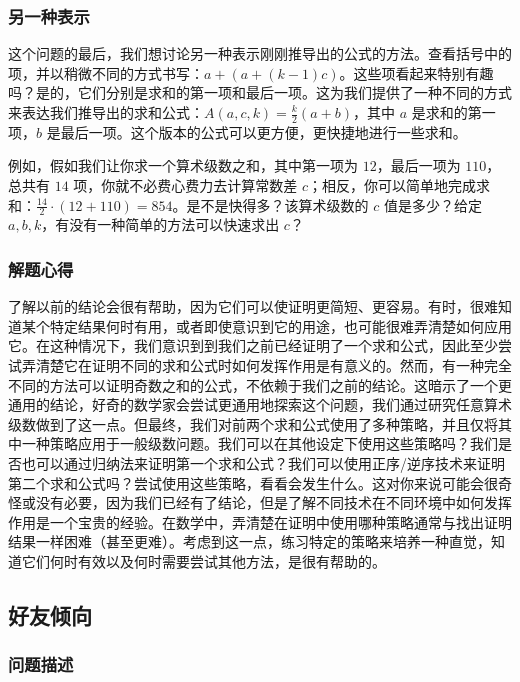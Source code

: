 \subsubsection*{另一种表示}

这个问题的最后，我们想讨论另一种表示刚刚推导出的公式的方法。查看括号中的项，并以稍微不同的方式书写：$a+ (a+ (k-1)c)$。这些项看起来特别有趣吗？是的，它们分别是求和的第一项和最后一项。这为我们提供了一种不同的方式来表达我们推导出的求和公式：$A(a, c, k) = \frac{k}{2}(a + b)$，其中 $a$ 是求和的第一项，$b$ 是最后一项。这个版本的公式可以更方便，更快捷地进行一些求和。

例如，假如我们让你求一个算术级数之和，其中第一项为 $12$，最后一项为 $110$，总共有 $14$ 项，你就不必费心费力去计算常数差 $c$；相反，你可以简单地完成求和：$\frac{14}{2} \cdot (12 + 110) = 854$。是不是快得多？该算术级数的 $c$ 值是多少？给定 $a,b,k$，有没有一种简单的方法可以快速求出 $c$？

\subsubsection*{解题心得}

了解以前的结论会很有帮助，因为它们可以使证明更简短、更容易。有时，很难知道某个特定结果何时有用，或者即使意识到它的用途，也可能很难弄清楚如何应用它。在这种情况下，我们意识到到我们之前已经证明了一个求和公式，因此至少尝试弄清楚它在证明不同的求和公式时如何发挥作用是有意义的。然而，有一种完全不同的方法可以证明奇数之和的公式，不依赖于我们之前的结论。这暗示了一个更通用的结论，好奇的数学家会尝试更通用地探索这个问题，我们通过研究任意算术级数做到了这一点。但最终，我们对前两个求和公式使用了多种策略，并且仅将其中一种策略应用于一般级数问题。我们可以在其他设定下使用这些策略吗？我们是否也可以通过归纳法来证明第一个求和公式？我们可以使用正序/逆序技术来证明第二个求和公式吗？尝试使用这些策略，看看会发生什么。这对你来说可能会很奇怪或没有必要，因为我们已经有了结论，但是了解不同技术在不同环境中如何发挥作用是一个宝贵的经验。在数学中，弄清楚在证明中使用哪种策略通常与找出证明结果一样困难（甚至更难）。考虑到这一点，练习特定的策略来培养一种直觉，知道它们何时有效以及何时需要尝试其他方法，是很有帮助的。

\subsection{好友倾向}

\subsubsection*{问题描述}

